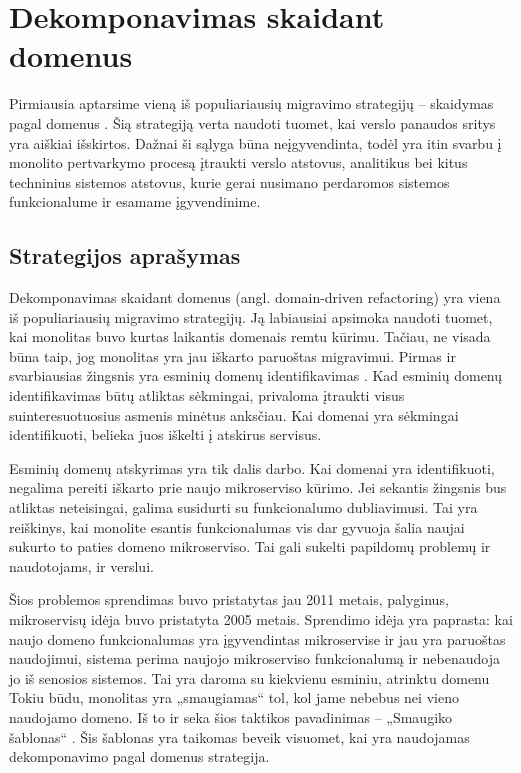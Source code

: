\documentclass[fleqn]{VUMIFPSkursinis}
\begin{document}
\section{Dekomponavimas skaidant domenus}
Pirmiausia aptarsime vieną iš populiariausių migravimo strategijų – skaidymas pagal domenus \cite{Wal22}. Šią strategiją verta naudoti tuomet, kai verslo panaudos sritys yra aiškiai išskirtos. Dažnai  ši sąlyga būna neįgyvendinta, todėl yra itin svarbu į monolito pertvarkymo procesą įtraukti verslo atstovus, analitikus bei kitus techninius sistemos atstovus, kurie gerai nusimano perdaromos sistemos funkcionalume ir esamame įgyvendinime.

\subsection{Strategijos aprašymas}
Dekomponavimas skaidant domenus (angl. domain-driven refactoring) yra viena iš populiariausių migravimo strategijų. Ją labiausiai apsimoka naudoti tuomet, kai monolitas buvo kurtas laikantis domenais remtu kūrimu. Tačiau, ne visada būna taip, jog monolitas yra jau iškarto paruoštas migravimui. Pirmas ir svarbiausias žingsnis yra esminių domenų identifikavimas \cite{LZ22}. Kad esminių domenų identifikavimas būtų atliktas sėkmingai, privaloma įtraukti visus suinteresuotuosius asmenis minėtus anksčiau. Kai domenai yra sėkmingai identifikuoti, belieka juos iškelti į atskirus servisus.

Esminių domenų atskyrimas yra tik dalis darbo. Kai domenai yra identifikuoti, negalima pereiti iškarto prie naujo mikroserviso kūrimo. Jei sekantis žingsnis bus atliktas neteisingai, galima susidurti su funkcionalumo dubliavimusi. Tai yra reiškinys, kai monolite esantis funkcionalumas vis dar gyvuoja šalia naujai sukurto to paties domeno mikroserviso. Tai gali sukelti papildomų problemų ir naudotojams, ir verslui.

Šios problemos sprendimas buvo pristatytas jau 2011 metais, palyginus, mikroservisų idėja buvo pristatyta 2005 metais. Sprendimo idėja yra paprasta: kai naujo domeno funkcionalumas yra įgyvendintas mikroservise ir jau yra paruoštas naudojimui, sistema perima naujojo mikroserviso funkcionalumą ir nebenaudoja jo iš senosios sistemos. Tai yra daroma su kiekvienu esminiu, atrinktu domenu Tokiu būdu, monolitas yra „smaugiamas“ tol, kol jame nebebus nei vieno naudojamo domeno. Iš to ir seka šios taktikos pavadinimas – „Smaugiko šablonas“ \cite{Beh18}. Šis šablonas yra taikomas beveik visuomet, kai yra naudojamas dekomponavimo pagal domenus strategija.
\end{document}
